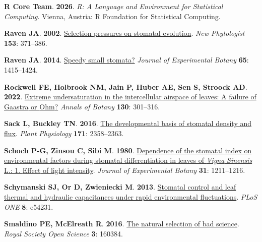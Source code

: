 \documentclass[
  letterpaper,
  DIV=11,
  numbers=noendperiod]{scrartcl}
\newlength{\cslhangindent}
\newenvironment{CSLReferences}[2] %
 {\begin{list}{}{%
  \setlength{\itemindent}{0pt}
  \setlength{\leftmargin}{0pt}
  \setlength{\parsep}{0pt}
  \ifodd #1
   \setlength{\leftmargin}{\cslhangindent}
   \setlength{\itemindent}{-1\cslhangindent}
  \fi
  \setlength{\itemsep}{#2\baselineskip}}}
 {\end{list}}
\begin{document}
\begin{CSLReferences}{0}{1}
\textbf{\textbf{R Core Team}}. \textbf{2026}. \emph{R: {A Language} and
{Environment} for {Statistical Computing}}. Vienna, Austria: R
Foundation for Statistical Computing.

\textbf{\textbf{Raven JA}}. \textbf{2002}.
\href{https://doi.org/10.1046/j.0028-646X.2001.00334.x}{Selection
pressures on stomatal evolution}. \emph{New Phytologist} \textbf{153}:
371--386.

\textbf{\textbf{Raven JA}}. \textbf{2014}.
\href{https://doi.org/10.1093/jxb/eru032}{Speedy small stomata?}
\emph{Journal of Experimental Botany} \textbf{65}: 1415--1424.

\textbf{\textbf{Rockwell FE}, \textbf{Holbrook NM}, \textbf{Jain P},
\textbf{Huber AE}, \textbf{Sen S}, \textbf{Stroock AD}}. \textbf{2022}.
\href{https://doi.org/10.1093/aob/mcac094}{Extreme undersaturation in
the intercellular airspace of leaves: A failure of {Gaastra} or {Ohm}?}
\emph{Annals of Botany} \textbf{130}: 301--316.

\textbf{\textbf{Sack L}, \textbf{Buckley TN}}. \textbf{2016}.
\href{https://doi.org/10.1104/pp.16.00476}{The developmental basis of
stomatal density and flux}. \emph{Plant Physiology} \textbf{171}:
2358--2363.

\textbf{\textbf{Schoch P-G}, \textbf{Zinsou C}, \textbf{Sibi M}}.
\textbf{1980}. \href{https://doi.org/10.1093/jxb/31.5.1211}{Dependence
of the stomatal index on environmental factors during stomatal
differentiation in leaves of {\emph{Vigna}}{ \emph{Sinensis}} {L}.: 1.
{Effect} of light intensity}. \emph{Journal of Experimental Botany}
\textbf{31}: 1211--1216.

\textbf{\textbf{Schymanski SJ}, \textbf{Or D}, \textbf{Zwieniecki M}}.
\textbf{2013}.
\href{https://doi.org/10.1371/journal.pone.0054231}{Stomatal control and
leaf thermal and hydraulic capacitances under rapid environmental
fluctuations}. \emph{PLoS ONE} \textbf{8}: e54231.

\textbf{\textbf{Smaldino PE}, \textbf{McElreath R}}. \textbf{2016}.
\href{https://doi.org/10.1098/rsos.160384}{The natural selection of bad
science}. \emph{Royal Society Open Science} \textbf{3}: 160384.


\end{CSLReferences}
\end{document}
